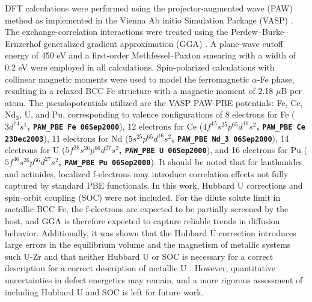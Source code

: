 \documentclass[preprint,12pt]{elsarticle}
\providecommand{\DIFaddtex}[1]{{\bf #1}} %
\providecommand{\DIFaddbegin}{\protect\color{blue}} %
\providecommand{\DIFaddend}{\protect\color{black}} %
\providecommand{\DIFadd}[1]{\texorpdfstring{\DIFaddtex{#1}}{#1}} %
\newcommand{\DIFaddincludegraphics}[2][]{{\color{blue}\fbox{\DIFOincludegraphics[#1]{#2}}}} %
\DeclareRobustCommand{\DIFaddbegin}{\DIFOaddbegin \let\includegraphics\DIFaddincludegraphics} %
\DeclareRobustCommand{\DIFaddend}{\DIFOaddend \let\includegraphics\DIFOincludegraphics} %
\begin{document}
\noindent DFT calculations were performed using the projector-augmented wave (PAW) method as implemented in the Vienna Ab initio Simulation Package (VASP) \cite{kresse_ab_1993, kresse_efficient_1996}. The exchange-correlation interactions were treated using the Perdew--Burke--Ernzerhof generalized gradient approximation (GGA) \cite{perdew_generalized_1996}. A plane-wave cutoff energy of 450 eV and a first-order Methfessel--Paxton smearing with a width of 0.2 eV were employed \cite{methfessel_high-precision_1989} in all calculations. Spin-polarized calculations with collinear magnetic moments were used to model the ferromagnetic $\alpha$-Fe phase, resulting in a relaxed BCC Fe structure with a magnetic moment of 2.18 $\mu$B per atom. The pseudopotentials utilized are the VASP PAW-PBE potentials: Fe, Ce, Nd$_3$, U, and Pu, corresponding to valence configurations of 8 electrons for Fe ($3d^74s^1$\DIFaddbegin \DIFadd{, \texttt{PAW\_PBE Fe 06Sep2000}}\DIFaddend ), 12 electrons for Ce ($4f^15s^25p^65d^16s^2$\DIFaddbegin \DIFadd{, \texttt{PAW\_PBE Ce 23Dec2003}}\DIFaddend ), 11 electrons for Nd ($5s^25p^65d^16s^2$\DIFaddbegin \DIFadd{, \texttt{PAW\_PBE Nd\_3 06Sep2000}}\DIFaddend ), 14 electrons for U ($5f^26s^26p^66d^27s^2$\DIFaddbegin \DIFadd{, \texttt{PAW\_PBE U 06Sep2000}}\DIFaddend ), and 16 electrons for Pu ($5f^46s^26p^66d^27s^2$\DIFaddbegin \DIFadd{, \texttt{PAW\_PBE Pu 06Sep2000}}\DIFaddend ).
It should be noted that for lanthanides and actinides, localized f-electrons may introduce correlation effects not fully captured by standard PBE functionals. In this work, Hubbard U corrections \cite{dudarev_effect_1997, cococcioni_linear_2005} and spin–orbit coupling (SOC) \cite{steiner_calculation_2016} were not included. For the dilute solute limit in metallic BCC Fe, the f-electrons are expected to be partially screened by the host, and GGA is therefore expected to capture reliable trends in diffusion behavior. Additionally, it was shown that the Hubbard U correction introduces large errors in the equilibrium volume and the magnetism of metallic systems such U-Zr \cite{soderlind_electron_2014, shousha_magnetism_2024} and that neither Hubbard U or SOC is necessary for a correct description for a correct description of metallic U \cite{soderlind_comment_2014}.
However, quantitative uncertainties in defect energetics may remain, and a more rigorous assessment of including Hubbard U and SOC is left for future work.
\end{document}

